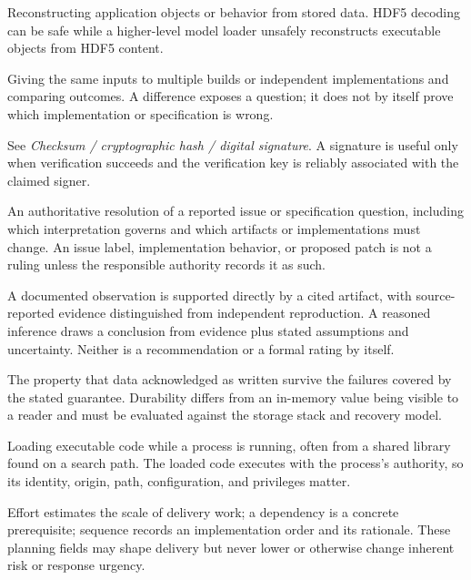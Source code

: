 \documentclass[../main.tex]{subfiles}
\begin{document}
\begin{description}[leftmargin=1.5em,style=nextline]
\item[Deserialization.]
Reconstructing application objects or behavior from stored data. HDF5 decoding
can be safe while a higher-level model loader unsafely reconstructs executable
objects from HDF5 content.

\item[Differential testing / differential conformance testing.]
Giving the same inputs to multiple builds or independent implementations and
comparing outcomes. A difference exposes a question; it does not by itself
prove which implementation or specification is wrong.

\item[Digital signature.]
See \emph{Checksum / cryptographic hash / digital signature}. A signature is
useful only when verification succeeds and the verification key is reliably
associated with the claimed signer.

\item[Disposition / ruling.]
An authoritative resolution of a reported issue or specification question,
including which interpretation governs and which artifacts or implementations
must change. An issue label, implementation behavior, or proposed patch is not
a ruling unless the responsible authority records it as such.

\item[Documented observation / reasoned inference.]
A documented observation is supported directly by a cited artifact, with
source-reported evidence distinguished from independent reproduction. A
reasoned inference draws a conclusion from evidence plus stated assumptions
and uncertainty. Neither is a recommendation or a formal rating by itself.

\item[Durability.]
The property that data acknowledged as written survive the failures covered by
the stated guarantee. Durability differs from an in-memory value being visible
to a reader and must be evaluated against the storage stack and recovery model.

\item[Dynamic loading / plugin loading.]
Loading executable code while a process is running, often from a shared
library found on a search path. The loaded code executes with the process's
authority, so its identity, origin, path, configuration, and privileges matter.

\item[Effort / implementation dependency / sequence.]
Effort estimates the scale of delivery work; a dependency is a concrete
prerequisite; sequence records an implementation order and its rationale.
These planning fields may shape delivery but never lower or otherwise change
inherent risk or response urgency.


\end{description}
\end{document}
